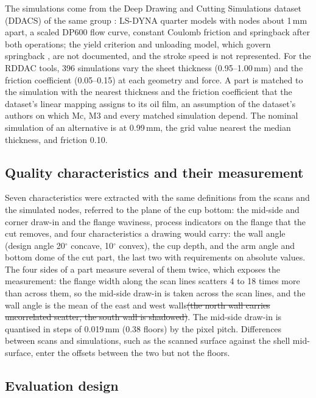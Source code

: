 \documentclass[pdflatex,sn-basic,lineno]{sn-jnl}
\providecommand{\DIFdel}[1]{{\protect\color{red}\sout{#1}}}                      %
\providecommand{\DIFdelbegin}{} %
\providecommand{\DIFdelend}{} %
\newcommand{\DIFscaledelfig}{0.5}
\newlength{\DIFdelgraphicswidth} %
\newlength{\DIFdelgraphicsheight} %
\newcommand{\DIFdelincludegraphics}[2][]{%
\sbox{\DIFdelgraphicsbox}{\DIFOincludegraphics[#1]{#2}}%
\settoboxwidth{\DIFdelgraphicswidth}{\DIFdelgraphicsbox} %
\settoboxtotalheight{\DIFdelgraphicsheight}{\DIFdelgraphicsbox} %
\scalebox{\DIFscaledelfig}{%
\parbox[b]{\DIFdelgraphicswidth}{\usebox{\DIFdelgraphicsbox}\\[-\baselineskip] \rule{\DIFdelgraphicswidth}{0em}}\llap{\resizebox{\DIFdelgraphicswidth}{\DIFdelgraphicsheight}{%
\setlength{\unitlength}{\DIFdelgraphicswidth}%
\begin{picture}(1,1)%
\thicklines\linethickness{2pt} %
{\color[rgb]{1,0,0}\put(0,0){\framebox(1,1){}}}%
{\color[rgb]{1,0,0}\put(0,0){\line( 1,1){1}}}%
{\color[rgb]{1,0,0}\put(0,1){\line(1,-1){1}}}%
\end{picture}%
}\hspace*{3pt}}} %
} %
\DeclareRobustCommand{\DIFdelbegin}{\DIFOdelbegin \let\includegraphics\DIFdelincludegraphics} %
\DeclareRobustCommand{\DIFdelend}{\DIFOaddend \let\includegraphics\DIFOincludegraphics} %
\begin{document}
The simulations come from the Deep Drawing and Cutting Simulations dataset (DDACS) of the same group \citep{baum2025ddacs, heinzelmann2025comprehensive}: LS-DYNA quarter models with nodes about 1\,mm apart, a scaled DP600 flow curve, constant Coulomb friction and springback after both operations; the yield criterion and unloading model, which govern springback \citep{yoshida2002model}, are not documented, and the stroke speed is not represented. For the RDDAC tools, 396 simulations vary the sheet thickness (0.95--1.00\,mm) and the friction coefficient (0.05--0.15) at each geometry and force. A part is matched to the simulation with the nearest thickness and the friction coefficient that the dataset's linear mapping assigns to its oil film, an assumption of the dataset's authors on which Mc, M3 and every matched simulation depend. The nominal simulation of an alternative is at 0.99\,mm, the grid value nearest the median thickness, and friction 0.10.

\subsection{Quality characteristics and their measurement}\label{sec:qcs}

Seven characteristics were extracted with the same definitions from the scans and the simulated nodes, referred to the plane of the cup bottom: the mid-side and corner draw-in and the flange waviness, process indicators on the flange that the cut removes, and four characteristics a drawing would carry: the wall angle (design angle 20$^\circ$ concave, 10$^\circ$ convex), the cup depth, and the arm angle and bottom dome of the cut part, the last two with requirements on absolute values. The four sides of a part measure several of them twice, which exposes the measurement: the flange width along the scan lines scatters 4 to 18 times more than across them, so the mid-side draw-in is taken across the scan lines, and the wall angle is the mean of the east and west walls\DIFdelbegin \DIFdel{(the north wall carries uncorrelated scatter, the south wall is shadowed)}\DIFdelend . The mid-side draw-in is quantised in steps of 0.019\,mm (0.38 floors) by the pixel pitch. Differences between scans and simulations, such as the scanned surface against the shell mid-surface, enter the offsets between the two but not the floors.

\subsection{Evaluation design}\label{sec:evaldesign}
\end{document}

